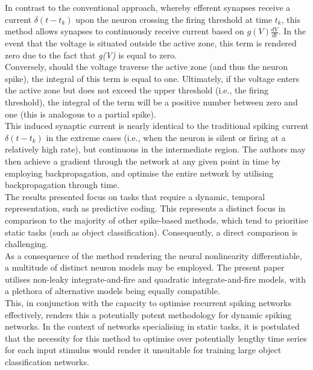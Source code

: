 \noindent In contrast to the conventional approach, whereby efferent synapses receive a current $\delta (t - t_k)$ upon the neuron crossing the firing threshold at time $t_k$, this method allows synapses to continuously receive current based on $g(V)\frac{dV}{dt}$. In the event that the voltage is situated outside the active zone, this term is rendered zero due to the fact that \textit{g(V)} is equal to zero. \\

\noindent Conversely, should the voltage traverse the active zone (and thus the neuron spike), the integral of this term is equal to one. Ultimately, if the voltage enters the active zone but does not exceed the upper threshold (i.e., the firing threshold), the integral of the term will be a positive number between zero and one (this is analogous to a partial spike). \\

\noindent This induced synaptic current is nearly identical to the traditional spiking current $\delta (t - t_k)$ in the extreme cases (i.e., when the neuron is silent or firing at a relatively high rate), but continuous in the intermediate region. The authors may then achieve a gradient through the network at any given point in time by employing backpropagation, and optimise the entire network by utilising backpropagation through time.\\

\noindent The results presented focus on tasks that require a dynamic, temporal representation, such as predictive coding. This represents a distinct focus in comparison to the majority of other spike-based methods, which tend to prioritise static tasks (such as object classification). Consequently, a direct comparison is challenging. \\

\noindent As a consequence of the method rendering the neural nonlinearity differentiable, a multitude of distinct neuron models may be employed. The present paper utilises non-leaky integrate-and-fire and quadratic integrate-and-fire models, with a plethora of alternative models being equally compatible. \\

\noindent This, in conjunction with the capacity to optimise recurrent spiking networks effectively, renders this a potentially potent methodology for dynamic spiking networks. In the context of networks specialising in static tasks, it is postulated that the necessity for this method to optimise over potentially lengthy time series for each input stimulus would render it unsuitable for training large object classification networks. \\

